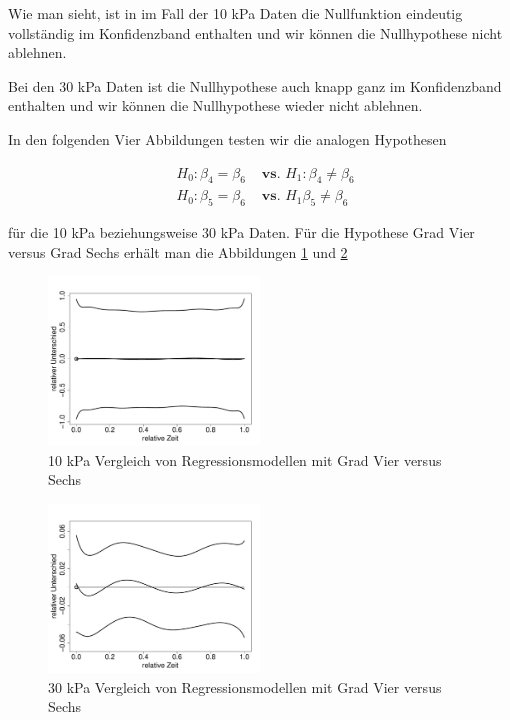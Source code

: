 \documentclass[12pt,a4paper]{article}
\theoremstyle{definition}
\theoremstyle{definition}
\theoremstyle{definition}
\theoremstyle{definition}
\begin{document}
Wie man sieht, ist in im Fall der 10 kPa Daten die Nullfunktion eindeutig vollständig im Konfidenzband enthalten und wir können die Nullhypothese nicht ablehnen.

Bei den 30 kPa Daten ist die Nullhypothese auch knapp ganz im Konfidenzband enthalten und wir können die Nullhypothese wieder nicht ablehnen.

In den folgenden Vier Abbildungen testen wir die analogen Hypothesen

\begin{eqnarray*}
& H_0 : \beta_4 = \beta_6 & \textbf{ vs. } H_1 : \beta_4 \neq \beta_6 \\
& H_0 : \beta_5 = \beta_6 & \textbf{ vs. } H_1 \beta_5 \neq \beta_6
\end{eqnarray*} 

für die 10 kPa beziehungsweise 30 kPa Daten. Für die Hypothese Grad Vier versus Grad Sechs erhält man die Abbildungen \ref{10kPa-Regmod-4-6} und \ref{30kPa-Regmod-4-6}

\begin{figure}[H] 
  \centering
     \includegraphics[width=0.5\textwidth]{10kPa-poly-KB-4-6.pdf}
  \caption{10 kPa Vergleich von Regressionsmodellen mit Grad Vier versus Sechs}
  \label{10kPa-Regmod-4-6}
\end{figure}

\begin{figure}[H] 
  \centering
     \includegraphics[width=0.5\textwidth]{30kPa-poly-KB-4-6.pdf}
  \caption{30 kPa Vergleich von Regressionsmodellen mit Grad Vier versus Sechs}
  \label{30kPa-Regmod-4-6}
\end{figure}
\end{document}
